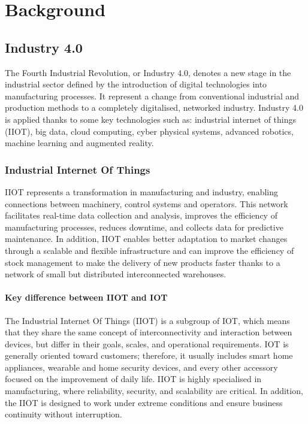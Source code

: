 \chapter{Background}
\label{cha:intro}

\section{Industry 4.0}
The Fourth Industrial Revolution, or Industry 4.0, denotes a new stage in the industrial sector defined by the introduction of digital technologies into manufacturing processes. It represent a change from conventional industrial and production methods to a completely digitalised, networked industry. Industry 4.0 is applied thanks to some key technologies such as: industrial internet of things (IIOT), big data, cloud computing, cyber physical systems, advanced robotics, machine learning and augmented reality.
\subsection{Industrial Internet Of Things}
IIOT represents a transformation in manufacturing and industry, enabling connections between machinery, control systems and operators. This network facilitates real-time data collection and analysis, improves the efficiency of manufacturing processes, reduces downtime, and collects data for predictive maintenance. In addition, IIOT enables better adaptation to market changes through a scalable and flexible infrastructure and can improve the efficiency of stock management to make the delivery of new products faster thanks to a network of small but distributed interconnected warehouses.
\subsubsection{Key difference between IIOT and IOT}
The Industrial Internet Of Things (IIOT) is a subgroup of IOT, which means that they share the same concept of interconnectivity and interaction between devices, but differ in their goals, scales, and operational requirements. IOT is generally oriented toward customers; therefore, it usually includes smart home appliances, wearable and home security devices, and every other accessory focused on the improvement of daily life. IIOT is highly specialised in manufacturing, where reliability, security, and scalability are critical. In addition, the IIOT is designed to work under extreme conditions and ensure business continuity without interruption.
